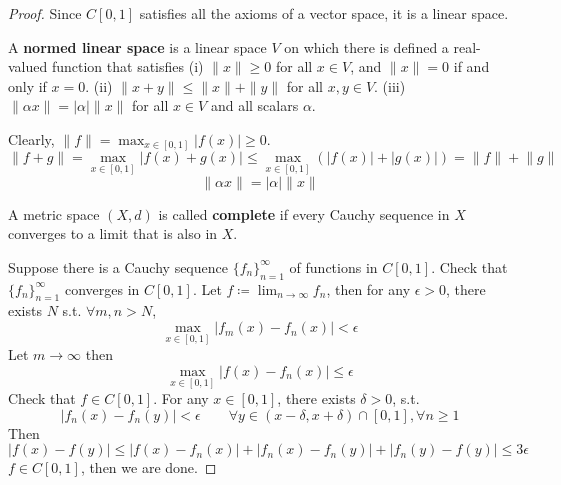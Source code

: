 \begin{proof}
Since $C[0,1]$ satisfies all the axioms of a vector space, it is a linear space.

\begin{definition}
A \textbf{normed linear space} is a linear space $V$ on which there is defined a real-valued function that satisfies
(i) $\|x\| \geq 0$ for all $x \in V$, and $\|x\|=0$ if and only if $x=0$.
(ii) $\|x+y\| \leq\|x\|+\|y\|$ for all $x, y \in V$.
(iii) $\|\alpha x\|=|\alpha|\|x\|$ for all $x \in V$ and all scalars $\alpha$.
\end{definition}
Clearly, $\lVert f \rVert=\max_{x\in[0,1]}\lvert f(x) \rvert\geq0$.
\[
\lVert f+g \rVert =\max_{x\in[0,1]}\lvert f(x)+g(x) \rvert \leq \max_{x\in[0,1]}(\lvert f(x) \rvert +\lvert g(x) \rvert )=\lVert f \rVert +\lVert g \rVert
\]
\[
\lVert \alpha x \rVert =\lvert \alpha \rvert \lVert x \rVert
\]
\begin{definition}
A metric space $(X, d)$ is called \textbf{complete} if every Cauchy sequence in $X$ converges to a limit that is also in $X$.
\end{definition}
Suppose there is a Cauchy sequence $\{ f_n \}_{n=1}^{\infty}$ of functions in $C[0,1]$. Check that $\{ f_n \}_{n=1}^{\infty}$ converges in $C[0,1]$. Let $f\coloneqq \lim_{ n \to \infty }f_n$, then for any $\epsilon>0$, there exists $N$ s.t. $\forall m,n>N$,
\[
\max_{x\in[0,1]}\lvert f_m(x)-f_n(x) \rvert <\epsilon 
\]
Let $m\to \infty$ then
\[
\max_{x\in[0,1]}\lvert f(x)-f_n(x) \rvert\leq \epsilon
\]
Check that $f\in C[0,1]$. For any $x\in[0,1]$, there exists $\delta>0$, s.t.
\[
\lvert f_n(x)-f_n(y) \rvert <\epsilon \qquad \forall y\in(x-\delta,x+\delta)\cap[0,1],\forall n\geq 1
\]
Then
\[
\lvert f(x)-f(y) \rvert \leq \lvert f(x)-f_n(x) \rvert +\lvert f_n(x)-f_n(y) \rvert +\lvert f_n(y)-f(y) \rvert \leq 3\epsilon
\]
$f\in C[0,1]$, then we are done.
\end{proof}
